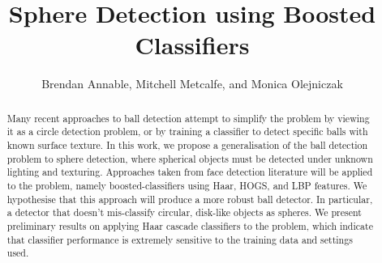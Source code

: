 \documentclass{llncs}
\begin{document}
    \mainmatter

    \title{Sphere Detection using Boosted Classifiers}
    \author{Brendan Annable, Mitchell Metcalfe, and Monica Olejniczak}


    \maketitle

    \begin{abstract}
    Many recent approaches to ball detection attempt to simplify the problem by viewing it as a circle detection problem, or by training a classifier to detect specific balls with known surface texture. In this work, we propose a generalisation of the ball detection problem to sphere detection, where spherical objects must be detected under unknown lighting and texturing. Approaches taken from face detection literature will be applied to the problem, namely boosted-classifiers using Haar, HOGS, and LBP features. We hypothesise that this approach will produce a more robust ball detector. In particular, a detector that doesn't mis-classify circular, disk-like objects as spheres. We present preliminary results on applying Haar cascade classifiers to the problem, which indicate that classifier performance is extremely sensitive to the training data and settings used.
    \end{abstract}
\end{document}
